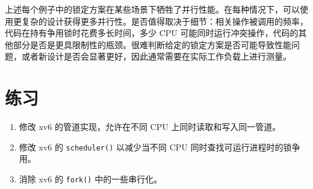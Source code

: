 上述每个例子中的锁定方案在某些场景下牺牲了并行性能。在每种情况下，可以使用更复杂的设计获得更多并行性。是否值得取决于细节：相关操作被调用的频率，代码在持有争用锁时花费多长时间，多少 CPU 可能同时运行冲突操作，代码的其他部分是否是更具限制性的瓶颈。很难判断给定的锁定方案是否可能导致性能问题，或者新设计是否会显著更好，因此通常需要在实际工作负载上进行测量。

\section{练习}

\begin{enumerate}

\item 修改 xv6 的管道实现，允许在不同 CPU 上同时读取和写入同一管道。

\item 修改 xv6 的 \texttt{scheduler()} 以减少当不同 CPU 同时查找可运行进程时的锁争用。

\item 消除 xv6 的 \texttt{fork()} 中的一些串行化。

\end{enumerate}
